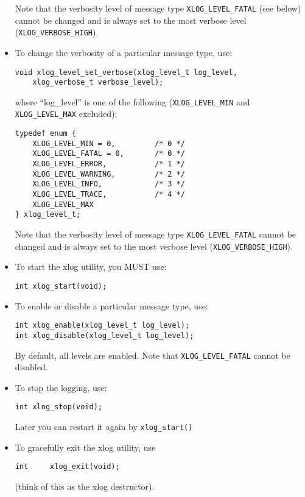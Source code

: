 \documentclass[11pt]{article}
\begin{document}
\begin{itemize}
  Note that the verbosity level of message type \verb=XLOG_LEVEL_FATAL=
  (see below) cannot be changed and is always set to the most verbose
  level (\verb=XLOG_VERBOSE_HIGH=).

  \item To change the verbosity of a particular message type, use:

\begin{verbatim}
void xlog_level_set_verbose(xlog_level_t log_level,
	xlog_verbose_t verbose_level);
\end{verbatim}

  where ``log\_level'' is one of the following (\verb=XLOG_LEVEL_MIN=
  and \verb=XLOG_LEVEL_MAX= excluded):

\begin{verbatim}
typedef enum {
    XLOG_LEVEL_MIN = 0,         /* 0 */
    XLOG_LEVEL_FATAL = 0,       /* 0 */
    XLOG_LEVEL_ERROR,           /* 1 */
    XLOG_LEVEL_WARNING,         /* 2 */
    XLOG_LEVEL_INFO,            /* 3 */
    XLOG_LEVEL_TRACE,           /* 4 */
    XLOG_LEVEL_MAX
} xlog_level_t;
\end{verbatim}

  Note that the verbosity level of message type \verb=XLOG_LEVEL_FATAL=
  cannot be changed and is always set to the most verbose level
  (\verb=XLOG_VERBOSE_HIGH=).

  \item To start the xlog utility, you MUST use:

\begin{verbatim}
int xlog_start(void);
\end{verbatim}


  \item To enable or disable a particular message type, use:

\begin{verbatim}
int xlog_enable(xlog_level_t log_level);
int xlog_disable(xlog_level_t log_level);
\end{verbatim}

  By default, all levels are enabled.
  Note that \verb=XLOG_LEVEL_FATAL= cannot be disabled.

  \item To stop the logging, use:

\begin{verbatim}
int xlog_stop(void);
\end{verbatim}

  Later you can restart it again by \verb=xlog_start()=

  \item To gracefully exit the xlog utility, use

\begin{verbatim}
int     xlog_exit(void);
\end{verbatim}

  (think of this as the xlog destructor).

\end{itemize}
\end{document}
